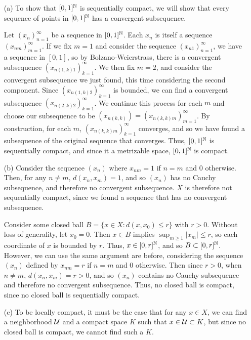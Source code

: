 \documentclass{hmwk}
\begin{document}
\begin{solution}
\begin{itemize}
    \item[(a)] To show that $[0, 1]^{\mathbb{N}}$ is sequentially compact, we will show that every sequence of points in $[0, 1]^{\mathbb{N}}$ has a convergent subsequence. 

    Let $(x_n)_{n=1}^\infty$ be a sequence in $[0, 1]^{\mathbb{N}}$. Each $x_n$ is itself a sequence $(x_{nm})_{m=1}^\infty$. If we fix $m = 1$ and consider the sequence $(x_{n1})_{n=1}^\infty$, we have a sequence in $[0, 1]$, so by Bolzano-Weierstrass, there is a convergent subsequence $(x_{n(1, k)1})_{k=1}^\infty$. We then fix $m = 2$, and consider the convergent subsequence we just found, this time considering the second component. Since $(x_{n(1, k)2})_{k=1}^\infty$ is bounded, we can find a convergent subsequence $(x_{n(2, k)2})_{k=1}^\infty$. We continue this process for each $m$ and choose our subsequence to be $(x_{n(k, k)}) = (x_{n(k, k)m})_{m=1}^\infty$. By construction, for each $m$, $(x_{n(k, k)m})_{k=1}^\infty$ converges, and so we have found a subsequence of the original sequence that converges. Thus, $[0, 1]^{\mathbb{N}}$ is sequentially compact, and since it a metrizable space, $[0, 1]^{\mathbb{N}}$ is compact. 

    \item[(b)] Consider the sequence $(x_n)$ where $x_{nm} = 1$ if $n=m$ and $0$ otherwise. Then, for any $n \neq m$, $d(x_n, x_m) = 1$, and so $(x_n)$ has no Cauchy subsequence, and therefore no convergent subsequence. $X$ is therefore not sequentially compact, since we found a sequence that has no convergent subsequence. 

    \pre Consider some closed ball $B = \{x \in X : d(x, x_0) \leq r\}$ with $r > 0$. Without loss of generality, let $x_0 = 0$. Then $x \in B$ implies $\sup_{m \geq 1} |x_m| \leq r$, so each coordinate of $x$ is bounded by $r$. Thus, $x \in [0, r]^{\mathbb{N}}$, and so $B \subset [0, r]^{\mathbb{N}}$. However, we can use the same argument are before, considering the sequence $(x_n)$ defined by $x_{nm} = r$ if $n = m$ and $0$ otherwise. Then since $r > 0$, when $n \neq m$, $d(x_n, x_m) = r > 0$, and so $(x_n)$ contains no Cauchy subsequence and therefore no convergent subsequence. Thus, no closed ball is compact, since no closed ball is sequentially compact. 

    \item[(c)] To be locally compact, it must be the case that for any $x \in X$, we can find a neighborhood $\mathcal{U}$ and a compact space $K$ such that $x \in \mathcal{U} \subset K$, but since no closed ball is compact, we cannot find such a $K$.


\end{itemize}
\end{solution}
\end{document}
